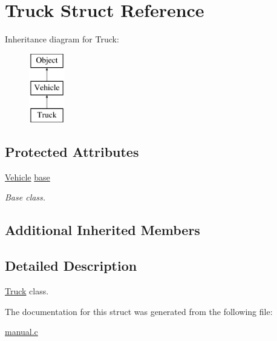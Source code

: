 \hypertarget{structTruck}{\section{Truck Struct Reference}
\label{structTruck}
}
Inheritance diagram for Truck\-:\begin{figure}[H]
\begin{center}
\leavevmode
\includegraphics[height=3.000000cm]{structTruck}
\end{center}
\end{figure}
\subsection*{Protected Attributes}
\begin{DoxyCompactItemize}
\item 
\hypertarget{structTruck_ad0ac321609dda1a6c552488b05ec7ac8}{\hyperlink{structVehicle}{Vehicle} \hyperlink{structTruck_ad0ac321609dda1a6c552488b05ec7ac8}{base}}\label{structTruck_ad0ac321609dda1a6c552488b05ec7ac8}

\begin{DoxyCompactList}\small\item\em Base class. \end{DoxyCompactList}\end{DoxyCompactItemize}
\subsection*{Additional Inherited Members}


\subsection{Detailed Description}
\hyperlink{structTruck}{Truck} class. 

The documentation for this struct was generated from the following file\-:\begin{DoxyCompactItemize}
\item 
\hyperlink{manual_8c}{manual.\-c}\end{DoxyCompactItemize}
